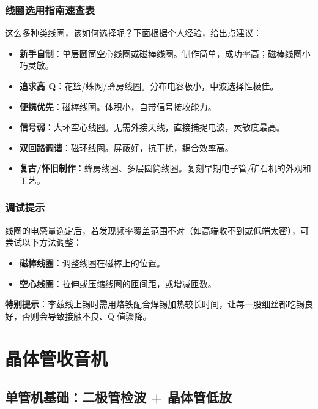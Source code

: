 \documentclass[12pt,UTF8]{ctexbook}
\begin{document}
\section{线圈选用指南速查表}

这么多种类线圈，该如何选择呢？下面根据个人经验，给出点建议：

\begin{itemize}[leftmargin=2cm]
	\item \textbf{新手自制}：单层圆筒空心线圈或磁棒线圈。制作简单，成功率高；磁棒线圈小巧灵敏。
	\item \textbf{追求高 Q}：花篮/蛛网/蜂房线圈。分布电容极小，中波选择性极佳。
	\item \textbf{便携优先}：磁棒线圈。体积小，自带信号接收能力。
	\item \textbf{信号弱}：大环空心线圈。无需外接天线，直接捕捉电波，灵敏度最高。
	\item \textbf{双回路调谐}：磁环线圈。屏蔽好，抗干扰，耦合效率高。
	\item \textbf{复古/怀旧制作}：蜂房线圈、多层圆筒线圈。复刻早期电子管/矿石机的外观和工艺。
\end{itemize}

\section{调试提示}

线圈的电感量选定后，若发现频率覆盖范围不对（如高端收不到或低端太密），可尝试以下方法调整：

\begin{itemize}[leftmargin=2cm]
	\item \textbf{磁棒线圈}：调整线圈在磁棒上的位置。
	\item \textbf{空心线圈}：拉伸或压缩线圈的匝间距，或增减匝数。
\end{itemize}

\textbf{特别提示}：李兹线上锡时需用烙铁配合焊锡加热较长时间，让每一股细丝都吃锡良好，否则会导致接触不良、Q 值骤降。


\part{晶体管收音机}
\label{part:transistor-radio}

\chapter{单管机基础：二极管检波 + 晶体管低放}
\label{chap:single-transistor-radio}
\end{document}
